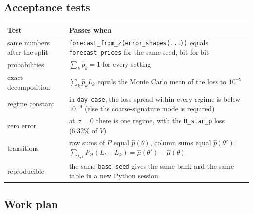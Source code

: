 \documentclass[10pt,a4paper]{article}
\newcommand{\code}[1]{\texttt{#1}}
\begin{document}
\subsection{Acceptance tests}
\label{sec:tests}
\begin{center}\small
\begin{tabularx}{\textwidth}{@{}l>{\raggedright\arraybackslash}X@{}}
\toprule
Test & Passes when \\
\midrule
same numbers after the split & \code{forecast\_from\_z(error\_shapes(...))} equals \code{forecast\_prices} for the same seed, bit for bit \\
probabilities & $\sum_k\hat p_k=1$ for every setting \\
exact decomposition & $\sum_k\hat p_kL_k$ equals the Monte Carlo mean of the loss to $10^{-9}$ \\
regime constant & in \code{day\_case}, the loss spread within every regime is below $10^{-9}$ (else the coarse-signature mode is required) \\
zero error & at $\sigma=0$ there is one regime, with the \code{B\_star\_p} loss (6.32\% of $V$) \\
transitions & row sums of $P$ equal $\hat p(\theta)$, column sums equal $\hat p(\theta')$; $\sum_{k,l}P_{kl}(L_l-L_k)=\hat\mu(\theta')-\hat\mu(\theta)$ \\
reproducible & the same \code{base\_seed} gives the same bank and the same table in a new Python session \\
\bottomrule
\end{tabularx}
\end{center}

\subsection{Work plan}
\begin{center}
\end{center}
\end{document}
